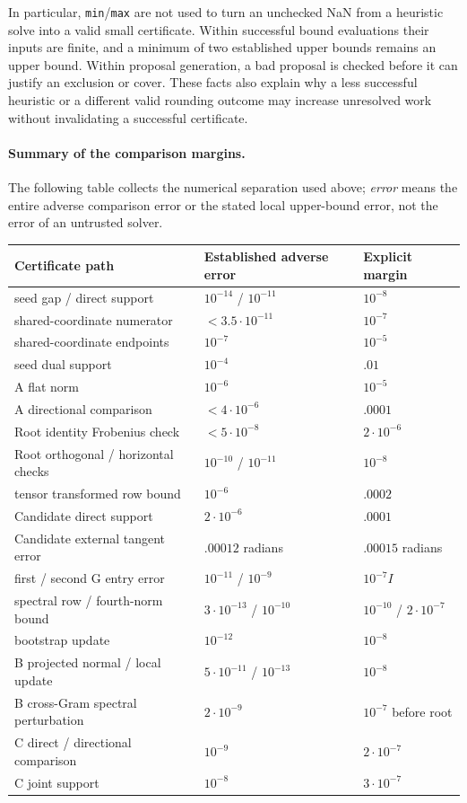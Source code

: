 In particular, \texttt{min}/\texttt{max} are not used to turn an
unchecked NaN from a heuristic solve into a valid small certificate.
Within successful bound evaluations their inputs are finite, and
a minimum of two established upper bounds remains an upper bound.
Within proposal generation, a bad proposal is checked before it can
justify an exclusion or cover.  These facts also explain why a
less successful heuristic or a different valid rounding outcome
may increase unresolved work without invalidating a successful
certificate.

\paragraph{Summary of the comparison margins.}
The following table collects the numerical separation used above;
\emph{error} means the entire adverse comparison error or the stated
local upper-bound error, not the error of an untrusted solver.
\begin{center}
\small
\begin{tabular}{p{.37\linewidth}p{.27\linewidth}p{.26\linewidth}}
\hline
Certificate path & Established adverse error & Explicit margin\\
\hline
seed gap / direct support & $10^{-14}$ / $10^{-11}$ & $10^{-8}$\\
shared-coordinate numerator & $<3.5\cdot10^{-11}$ & $10^{-7}$\\
shared-coordinate endpoints & $10^{-7}$ & $10^{-5}$\\
seed dual support & $10^{-4}$ & $.01$\\
A flat norm & $10^{-6}$ & $10^{-5}$\\
A directional comparison & $<4\cdot10^{-6}$ & $.0001$\\
Root identity Frobenius check & $<5\cdot10^{-8}$ & $2\cdot10^{-6}$\\
Root orthogonal / horizontal checks & $10^{-10}$ / $10^{-11}$ & $10^{-8}$\\
tensor transformed row bound & $10^{-6}$ & $.0002$\\
Candidate direct support & $2\cdot10^{-6}$ & $.0001$\\
Candidate external tangent error & $.00012$ radians & $.00015$ radians\\
first / second G entry error & $10^{-11}$ / $10^{-9}$ & $10^{-7}I$\\
spectral row / fourth-norm bound & $3\cdot10^{-13}$ / $10^{-10}$ &
 $10^{-10}$ / $2\cdot10^{-7}$\\
bootstrap update & $10^{-12}$ & $10^{-8}$\\
B projected normal / local update & $5\cdot10^{-11}$ / $10^{-13}$ & $10^{-8}$\\
B cross-Gram spectral perturbation & $2\cdot10^{-9}$ & $10^{-7}$ before root\\
C direct / directional comparison & $10^{-9}$ & $2\cdot10^{-7}$\\
C joint support & $10^{-8}$ & $3\cdot10^{-7}$\\
\hline
\end{tabular}
\end{center}
